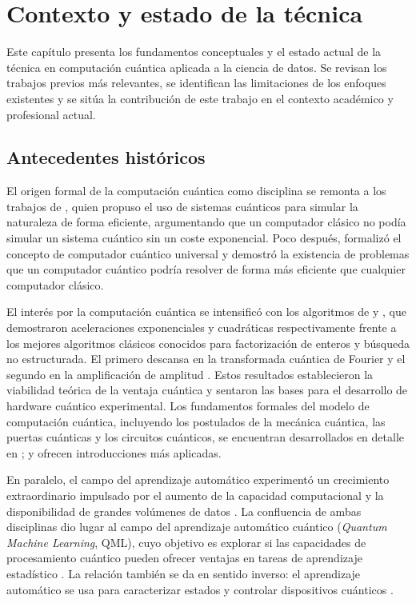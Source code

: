 \chapter{Contexto y estado de la técnica}\label{cap:contexto}

Este capítulo presenta los fundamentos conceptuales y el estado actual de la técnica en computación cuántica aplicada a la ciencia de datos. Se revisan los trabajos previos más relevantes, se identifican las limitaciones de los enfoques existentes y se sitúa la contribución de este trabajo en el contexto académico y profesional actual.

\section{Antecedentes históricos}

El origen formal de la computación cuántica como disciplina se remonta a los trabajos de \cite{feynman1982}, quien propuso el uso de sistemas cuánticos para simular la naturaleza de forma eficiente, argumentando que un computador clásico no podía simular un sistema cuántico sin un coste exponencial. Poco después, \cite{deutsch1985} formalizó el concepto de computador cuántico universal y demostró la existencia de problemas que un computador cuántico podría resolver de forma más eficiente que cualquier computador clásico.

El interés por la computación cuántica se intensificó con los algoritmos de \cite{shor1994} y \cite{grover1996}, que demostraron aceleraciones exponenciales y cuadráticas respectivamente frente a los mejores algoritmos clásicos conocidos para factorización de enteros y búsqueda no estructurada. El primero descansa en la transformada cuántica de Fourier y el segundo en la amplificación de amplitud \citep{pennylaneQftGroups, pennylaneGrover}. Estos resultados establecieron la viabilidad teórica de la ventaja cuántica y sentaron las bases para el desarrollo de hardware cuántico experimental. Los fundamentos formales del modelo de computación cuántica, incluyendo los postulados de la mecánica cuántica, las puertas cuánticas y los circuitos cuánticos, se encuentran desarrollados en detalle en \cite{nielsen2010}; \cite{cernAtos2021} y \cite{qzBeginners} ofrecen introducciones más aplicadas.

En paralelo, el campo del aprendizaje automático experimentó un crecimiento extraordinario impulsado por el aumento de la capacidad computacional y la disponibilidad de grandes volúmenes de datos \citep{jordan2015}. La confluencia de ambas disciplinas dio lugar al campo del aprendizaje automático cuántico (\textit{Quantum Machine Learning}, QML), cuyo objetivo es explorar si las capacidades de procesamiento cuántico pueden ofrecer ventajas en tareas de aprendizaje estadístico \citep{biamonte2017}. La relación también se da en sentido inverso: el aprendizaje automático se usa para caracterizar estados y controlar dispositivos cuánticos \citep{fastovets2019}.

